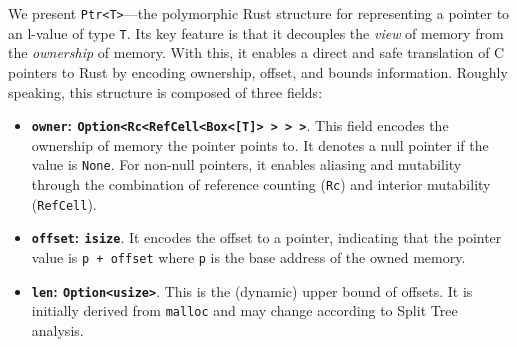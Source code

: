 \documentclass{llncs} %
\begin{document}
We present \texttt{Ptr<T>}---the polymorphic Rust structure for representing a pointer to an l-value of type \texttt{T}. Its key feature is that it decouples the \textit{view} of memory from the \textit{ownership} of memory. With this, it enables a direct and safe translation of C pointers to Rust by encoding ownership, offset, and bounds information. Roughly speaking, this structure is composed of three fields:
%
\begin{itemize}
\item \textbf{\texttt{owner}: \texttt{Option<Rc<RefCell<Box<[T]> > > >}}. This field encodes the ownership of memory the pointer points to. It denotes a null pointer if the value is \texttt{None}. For non-null pointers, it enables aliasing and mutability through the combination of reference counting (\texttt{Rc}) and interior mutability (\texttt{RefCell}).

\item \textbf{\texttt{offset}: \texttt{isize}}. It encodes the offset to a pointer, indicating that the pointer value is \texttt{p + offset} where \texttt{p} is the base address of the owned memory.
  
\item \textbf{\texttt{len}: \texttt{Option<usize>}}. This is the (dynamic) upper bound of offsets. It is initially derived from \texttt{malloc} and may change according to Split Tree analysis.

\end{itemize}

\end{document}
